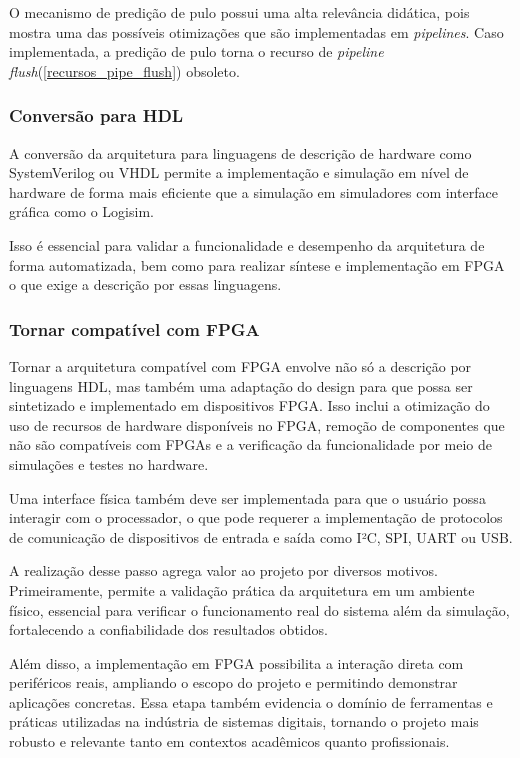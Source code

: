 \documentclass[
	12pt,				%
	openright,			%
	oneside,			%
	a4paper,			%
	english,			%
	french,				%
	spanish,			%
	brazil,				%
	]{abntex2}
\begin{document}
O mecanismo de predição de pulo possui uma alta relevância didática, pois mostra uma das possíveis otimizações que são implementadas em \textit{pipelines}. Caso implementada, a predição de pulo torna o recurso de \textit{pipeline flush}(\ref{recursos_pipe_flush}) obsoleto.

\subsubsection{Conversão para HDL}\label{recursos_hdl}%

A conversão da arquitetura para linguagens de descrição de hardware como SystemVerilog ou VHDL permite a implementação e simulação em nível de hardware de forma mais eficiente que a simulação em simuladores com interface gráfica como o Logisim.

Isso é essencial para validar a funcionalidade e desempenho da arquitetura de forma automatizada, bem como para realizar síntese e implementação em FPGA o que exige a descrição por essas linguagens.

\subsubsection{Tornar compatível com FPGA}\label{recursos_fpga}%

Tornar a arquitetura compatível com FPGA envolve não só a descrição por linguagens HDL, mas também uma adaptação do design para que possa ser sintetizado e implementado em dispositivos FPGA. Isso inclui a otimização do uso de recursos de hardware disponíveis no FPGA, remoção de componentes que não são compatíveis com FPGAs e a verificação da funcionalidade por meio de simulações e testes no hardware.

Uma interface física também deve ser implementada para que o usuário possa interagir com o processador, o que pode requerer a implementação de protocolos de comunicação de dispositivos de entrada e saída como I²C, SPI, UART ou USB.

A realização desse passo agrega valor ao projeto por diversos motivos. Primeiramente, permite a validação prática da arquitetura em um ambiente físico, essencial para verificar o funcionamento real do sistema além da simulação, fortalecendo a confiabilidade dos resultados obtidos.

Além disso, a implementação em FPGA possibilita a interação direta com periféricos reais, ampliando o escopo do projeto e permitindo demonstrar aplicações concretas. Essa etapa também evidencia o domínio de ferramentas e práticas utilizadas na indústria de sistemas digitais, tornando o projeto mais robusto e relevante tanto em contextos acadêmicos quanto profissionais.
\end{document}
